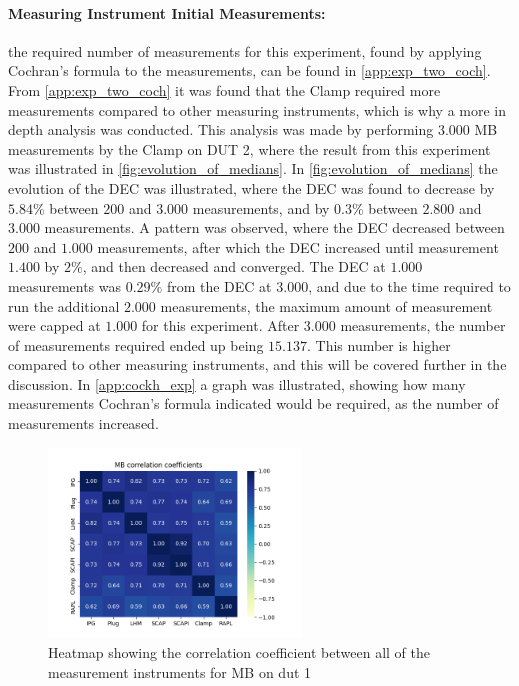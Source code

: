 \paragraph{Measuring Instrument Initial Measurements:} the required number of measurements for this experiment, found by applying Cochran's formula to the measurements, can be found in \cref{app:exp_two_coch}. %
From \cref{app:exp_two_coch} it was found that the Clamp required more measurements compared to other measuring instruments, which is why a more in depth analysis was conducted. This analysis was made by performing $3.000$ MB measurements by the Clamp on DUT 2, where the result from this experiment was illustrated in \cref{fig:evolution_of_medians}. In \cref{fig:evolution_of_medians} the evolution of the DEC was illustrated, where the DEC was found to decrease by $5.84\%$ between $200$ and $3.000$ measurements, and by $0.3\%$ between $2.800$ and $3.000$ measurements. A pattern was observed, where the DEC decreased between $200$ and $1.000$ measurements, after which the DEC increased until measurement $1.400$ by $2\%$, and then decreased and converged. The DEC at $1.000$ measurements was $0.29\%$ from the DEC at $3.000$, and due to the time required to run the additional $2.000$ measurements, the maximum amount of measurement were capped at $1.000$ for this experiment. After $3.000$ measurements, the number of measurements required ended up being $15.137$. This number is higher compared to other measuring instruments, and this will be covered further in the discussion. In \cref{app:cockh_exp} a graph was illustrated, showing how many measurements Cochran's formula indicated would be required, as the number of measurements increased. 



\begin{figure}[H]
    \centering
    \hspace*{-1cm} %
    \includegraphics[width=0.6\textwidth]{figures/MandelbrotDut1.png}
    \caption{Heatmap showing the correlation coefficient between all of the measurement instruments for MB on dut 1}
    \label{fig:mandelCorrDut1}
\end{figure}

